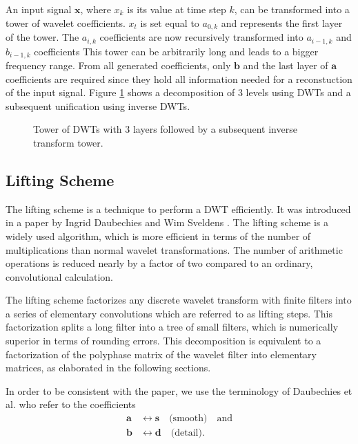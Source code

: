 \begin{refsection}
%
An input signal $\bm x$, where $x_k$ is its value at time step $k$, can be transformed into a tower of wavelet coefficients.
$x_t$ is set equal to $a_{0,k}$ and represents the first layer of the tower.
The $a_{i,k}$ coefficients are now recursively transformed into $a_{i-1,k}$ and $b_{i-1,k}$ coefficients
This tower can be arbitrarily long and leads to a bigger frequency range.
From all generated coefficients, only $\bm b$ and the last layer of $\bm a$ coefficients are required since they hold all information needed for a reconstuction of the input signal.
Figure \ref{fpga:fig:dwtTower} shows a decomposition of 3 levels using DWTs and a subsequent unification using inverse DWTs.
\begin{figure}
	\centering
	
	\caption{Tower of DWTs with 3 layers followed by a subsequent inverse transform tower.}
	\label{fpga:fig:dwtTower}
\end{figure}

\subsection{Lifting Scheme}
%

The lifting scheme is a technique to perform a DWT efficiently.
It was introduced in a paper by Ingrid Daubechies and Wim Sveldens \cite{fpga:Daubechies1998}. 
%
%
The lifting scheme is a widely used algorithm, which is more efficient in terms of the number of multiplications than normal wavelet transformations.
The number of arithmetic operations is reduced nearly by a factor of two compared to an ordinary, convolutional calculation.

The lifting scheme factorizes any discrete wavelet transform with finite filters into a series of elementary convolutions which are referred to as lifting steps.
This factorization splits a long filter into a tree of small filters, which is numerically superior in terms of rounding errors.
This decomposition is equivalent to a factorization of the polyphase matrix of the wavelet filter into elementary matrices, as elaborated in the following sections.
%

In order to be consistent with the paper, we use the terminology of Daubechies et al. who refer to the coefficients
\begin{align}
\bm a & \leftrightarrow \bm s \quad \text{(smooth)} \quad \text{and} \\
\bm b & \leftrightarrow \bm d \quad \text{(detail)} .
\end{align}


\end{refsection}
